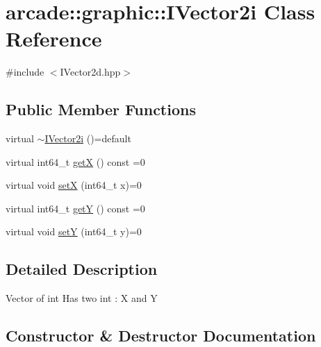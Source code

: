 \hypertarget{classarcade_1_1graphic_1_1_i_vector2i}{}\section{arcade\+::graphic\+::I\+Vector2i Class Reference}
\label{classarcade_1_1graphic_1_1_i_vector2i}


{\ttfamily \#include $<$I\+Vector2d.\+hpp$>$}

\subsection*{Public Member Functions}
\begin{DoxyCompactItemize}
\item 
virtual \mbox{\hyperlink{classarcade_1_1graphic_1_1_i_vector2i_a6970b3bc7ba56ddab62e204da8c8ee61}{$\sim$\+I\+Vector2i}} ()=default
\item 
virtual int64\+\_\+t \mbox{\hyperlink{classarcade_1_1graphic_1_1_i_vector2i_a63a56c6cc94bfa2269f1f863207c3407}{getX}} () const =0
\item 
virtual void \mbox{\hyperlink{classarcade_1_1graphic_1_1_i_vector2i_a3ef07e88c3402db1483253080ca4c4cb}{setX}} (int64\+\_\+t x)=0
\item 
virtual int64\+\_\+t \mbox{\hyperlink{classarcade_1_1graphic_1_1_i_vector2i_a015a561871d04bf7ec5e1f900d56015e}{getY}} () const =0
\item 
virtual void \mbox{\hyperlink{classarcade_1_1graphic_1_1_i_vector2i_a7102b9873dc2860392035b329ef84a0f}{setY}} (int64\+\_\+t y)=0
\end{DoxyCompactItemize}


\subsection{Detailed Description}
Vector of int Has two int \+: X and Y 

\subsection{Constructor \& Destructor Documentation}
\mbox{\label{classarcade_1_1graphic_1_1_i_vector2i_a6970b3bc7ba56ddab62e204da8c8ee61}} 
